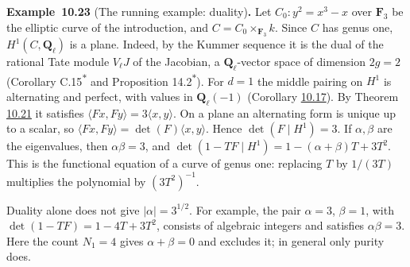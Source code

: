 \documentclass[11pt]{article}
\newenvironment{bpstatement}[2]{\par\addvspace{0.6\baselineskip}\noindent\textbf{#1}#2\textbf{.}\enspace\ignorespaces}
  {\par\addvspace{0.4\baselineskip}}
\newcommand{\bpout}[1]{#1\textsuperscript{\hyperlink{bp-outside}{\ensuremath{\ast}}}}
\begin{document}
\label{bp69}%
\begin{bpstatement}{Example~10.23}{ (The running example: duality)}
Let \(C_0\colon y^2=x^3-x\) over \(\mathbf F_3\) be the elliptic curve of the introduction, and \(C=C_0\times_{\mathbf F_3}k\). Since \(C\) has genus one, \(H^1(C,\mathbf Q_\ell)\) is a plane. Indeed, by the Kummer sequence it is the dual of the rational Tate module \(V_\ell J\) of the Jacobian, a \(\mathbf Q_\ell\)-vector space of dimension \(2g=2\) (Corollary \bpout{C.15} and Proposition \bpout{14.2}). For \(d=1\) the middle pairing on \(H^1\) is alternating and perfect, with values in \(\mathbf Q_\ell(-1)\) (Corollary \hyperref[bp52]{10.17}). By Theorem \hyperref[bp65]{10.21} it satisfies \(\langle Fx,Fy\rangle=3\langle x,y\rangle\). On a plane an alternating form is unique up to a scalar, so \(\langle Fx,Fy\rangle=\det(F)\langle
x,y\rangle\). Hence \(\det(F\mid H^1)=3\). If \(\alpha,\beta\) are the eigenvalues, then \(\alpha\beta=3\), and \(\det(1-TF\mid H^1)=1-(\alpha+\beta)T+3T^2\). This is the functional equation of a curve of genus one: replacing \(T\) by \(1/(3T)\) multiplies the polynomial by \((3T^2)^{-1}\).

Duality alone does not give \(|\alpha|=3^{1/2}\). For example, the pair \(\alpha=3\), \(\beta=1\), with \(\det(1-TF)=1-4T+3T^2\), consists of algebraic integers and satisfies \(\alpha\beta=3\). Here the count \(N_1=4\) gives \(\alpha+\beta=0\) and excludes it; in general only purity does.
\end{bpstatement}



\clearpage{}\hypertarget{bp-outside}{}%
\end{document}
